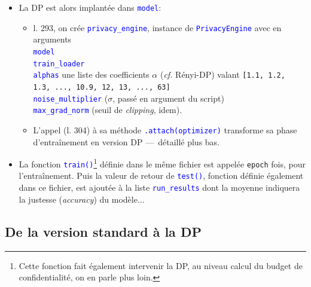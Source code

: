 \documentclass[a4paper,11pt]{article} %
\newcommand{\ttt}[1]{\texttt{#1}}
\newcommand{\code}[1]{\textcolor{blue}{\texttt{#1}}}
\begin{document}
\begin{itemize}
    \item
    La DP est alors implantée dans \code{model}:
    \begin{itemize}
        \item
            l. 293, on crée \code{privacy\_engine}, instance de \code{PrivacyEngine} avec en arguments\\
            \code{model}\\
            \code{train\_loader}\\
            \code{alphas} une liste des coefficients $\alpha$ (\emph{cf.} Rényi-DP) valant {\ttt{[1.1, 1.2, 1.3, ..., 10.9, 12, 13, ..., 63]}}\\
            \code{noise\_multiplier} ($\sigma$, passé en argument du script)\\
            \code{max\_grad\_norm} (seuil de \emph{clipping}, idem).
        \item
        L'appel (l. 304) à sa méthode \code{.attach(optimizer)} transforme sa phase d'entraînement en version DP ---~détaillé plus bas.
    \end{itemize}
    \item
    La fonction \code{train()}\footnote{Cette fonction fait également intervenir la DP, au niveau calcul du budget de confidentialité, on en parle plus loin.} définie dans le même fichier est appelée \ttt{epoch} fois, pour l'entraînement. Puis la valeur de retour de \code{test()}, fonction définie également dans ce fichier, est ajoutée à la liste \code{run\_results} dont la moyenne indiquera la justesse (\emph{accuracy}) du modèle...
\end{itemize}
%
\subsection{De la version standard à la DP}
%
\end{document}
